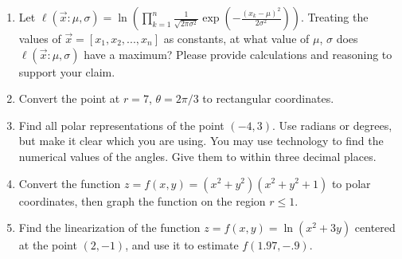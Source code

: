 \documentclass{article}
\begin{document}
\begin{itemize}
\begin{enumerate}
                    \item Let $\displaystyle \ell(\vec{x}:\mu, \sigma) = \ln\left(\prod_{k=1}^{n} \frac{1}{\sqrt{2\pi\sigma^2}}\exp\left(-\frac{(x_k-\mu)^2}{2\sigma^2}\right)\right)$.  Treating the values of $\vec{x} = [x_1, x_2, ..., x_n]$ as constants, at what value of $\mu$, $\sigma$ does $\ell(\vec{x}:\mu, \sigma)$ have a maximum?  Please provide calculations and reasoning to support your claim.
                    \item Convert the point at $r=7$, $\theta = 2\pi/3$ to rectangular coordinates.
                    \item Find all polar representations of the point $(-4, 3)$. Use radians or degrees, but make it clear which you are using. You may use technology to find the numerical values of the angles. Give them to within three decimal places.
                    \item Convert the function $z=f(x,y) = (x^2+y^2)(x^2+y^2+1)$ to polar coordinates, then graph the function on the region $r \leq 1$.
                    \item Find the linearization of the function $\displaystyle z=f(x,y) = \ln(x^2 +3y)$ centered at the point $(2, -1)$, and use it to estimate $f(1.97, -.9)$. 
                \end{enumerate}
        \end{itemize}
\end{document}
